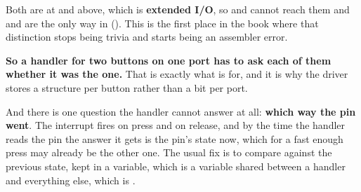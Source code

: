 Both are at  and above, which is \textbf{extended I/O}, so  and 
cannot reach them and  and  are the only way in ().
This is the first place in the book where that distinction stops being trivia and starts being an
assembler error.

\textbf{So a handler for two buttons on one port has to ask each of them whether it was the one.}
That is exactly what  is for, and it is why the driver stores a structure per
button rather than a bit per port.

And there is one question the handler cannot answer at all: \textbf{which way the pin went}. The
interrupt fires on press and on release, and by the time the handler reads the pin the answer it
gets is the pin's state now, which for a fast enough press may already be the other one. The usual
fix is to compare against the previous state, kept in a variable, which is a variable shared
between a handler and everything else, which is .
